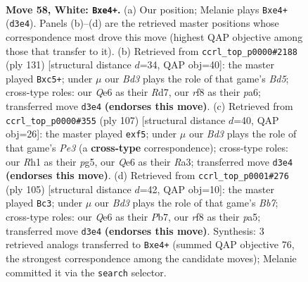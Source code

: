 \documentclass[11pt]{article}
\begin{document}
\clearpage

\begin{figure}[p]\centering
\begin{subfigure}{0.46\textwidth}\centering
\resizebox{\linewidth}{!}{%
\newchessgame
\chessboard[
  setfen={5r2/7k/4Q3/8/4b2P/3B4/1p4P1/6KR w - - 7 58},
  showmover=false,
  pgfstyle=straightmove, color=movearrow, markmove={d3-e4}
]}
\caption{}
\end{subfigure}\hfill
\begin{subfigure}{0.46\textwidth}\centering
\resizebox{\linewidth}{!}{%
\newchessgame
\chessboard[
  setfen={8/3r4/P7/2B5/1K1b2k1/7p/8/7R b - - 2 66},
  showmover=false,
  pgfstyle=straightmove, color=movearrow, markmove={d4-c5}
]}
\caption{}
\end{subfigure}
\\[4pt]
\begin{subfigure}{0.46\textwidth}\centering
\resizebox{\linewidth}{!}{%
\newchessgame
\chessboard[
  setfen={5k2/R7/4p3/p4BP1/8/r7/7K/8 b - - 0 54},
  showmover=false,
  pgfstyle=straightmove, color=movearrow, markmove={e6-f5}
]}
\caption{}
\end{subfigure}\hfill
\begin{subfigure}{0.46\textwidth}\centering
\resizebox{\linewidth}{!}{%
\newchessgame
\chessboard[
  setfen={2k5/1pr5/8/PR6/2P5/8/1b6/3B1K2 b - - 1 53},
  showmover=false,
  pgfstyle=straightmove, color=movearrow, markmove={b2-c3}
]}
\caption{}
\end{subfigure}
\caption{\textbf{Move 58, White: \texttt{Bxe4+}.} (a) Our position; Melanie plays \texttt{Bxe4+} (\texttt{d3e4}). Panels (b)--(d) are the retrieved master positions whose correspondence most drove this move (highest QAP objective among those that transfer to it). (b) Retrieved from \texttt{ccrl\_top\_p0000\#2188} (ply 131) [structural distance $d$=34, QAP obj=40]: the master played \texttt{Bxc5+}; under $\mu$ our \emph{Bd3} plays the role of that game's \emph{Bd5}; cross-type roles: our \emph{Q}e6 as their \emph{R}d7, our \emph{r}f8 as their \emph{p}a6; transferred move \texttt{d3e4} \textbf{(endorses this move)}. (c) Retrieved from \texttt{ccrl\_top\_p0000\#355} (ply 107) [structural distance $d$=40, QAP obj=26]: the master played \texttt{exf5}; under $\mu$ our \emph{Bd3} plays the role of that game's \emph{Pe3} (a \textbf{cross-type} correspondence); cross-type roles: our \emph{R}h1 as their \emph{p}g5, our \emph{Q}e6 as their \emph{R}a3; transferred move \texttt{d3e4} \textbf{(endorses this move)}. (d) Retrieved from \texttt{ccrl\_top\_p0001\#276} (ply 105) [structural distance $d$=42, QAP obj=10]: the master played \texttt{Bc3}; under $\mu$ our \emph{Bd3} plays the role of that game's \emph{Bb7}; cross-type roles: our \emph{Q}e6 as their \emph{P}b7, our \emph{r}f8 as their \emph{p}a5; transferred move \texttt{d3e4} \textbf{(endorses this move)}. Synthesis: 3 retrieved analogs transferred to \texttt{Bxe4+} (summed QAP objective 76, the strongest correspondence among the candidate moves); Melanie committed it via the \texttt{search} selector.}
\label{fig:thought-m114}
\end{figure}
\end{document}

